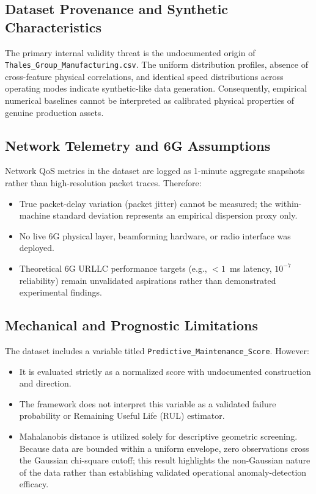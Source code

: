 \documentclass[journal]{IEEEtran}
\begin{document}
\subsection{Dataset Provenance and Synthetic Characteristics}
The primary internal validity threat is the undocumented origin of \texttt{Thales\_Group\_Manufacturing.csv}. The uniform distribution profiles, absence of cross-feature physical correlations, and identical speed distributions across operating modes indicate synthetic-like data generation. Consequently, empirical numerical baselines cannot be interpreted as calibrated physical properties of genuine production assets.

\subsection{Network Telemetry and 6G Assumptions}
Network QoS metrics in the dataset are logged as 1-minute aggregate snapshots rather than high-resolution packet traces. Therefore:
\begin{itemize}
    \item True packet-delay variation (packet jitter) cannot be measured; the within-machine standard deviation represents an empirical dispersion proxy only.
    \item No live 6G physical layer, beamforming hardware, or radio interface was deployed.
    \item Theoretical 6G URLLC performance targets (e.g., $< 1$~ms latency, $10^{-7}$ reliability) remain unvalidated aspirations rather than demonstrated experimental findings.
\end{itemize}

\subsection{Mechanical and Prognostic Limitations}
The dataset includes a variable titled \texttt{Predictive\_Maintenance\_Score}. However:
\begin{itemize}
    \item It is evaluated strictly as a normalized score with undocumented construction and direction.
    \item The framework does not interpret this variable as a validated failure probability or Remaining Useful Life (RUL) estimator.
    \item Mahalanobis distance is utilized solely for descriptive geometric screening. Because data are bounded within a uniform envelope, zero observations cross the Gaussian chi-square cutoff; this result highlights the non-Gaussian nature of the data rather than establishing validated operational anomaly-detection efficacy.
\end{itemize}
\end{document}
